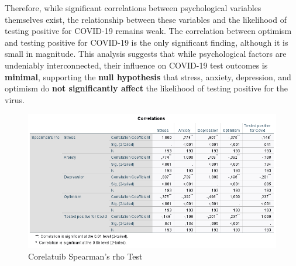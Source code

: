 \documentclass[a4paper]{article}
\begin{document}
\vspace{0.5em}\newline
Therefore, while significant correlations between psychological variables themselves exist, the relationship between these variables and the likelihood of testing positive for COVID-19 remains weak.
The correlation between optimism and testing positive for COVID-19 is the only significant finding, although it is small in magnitude.
\vspace{0.5em}\newline
This analysis suggests that while psychological factors are undeniably interconnected, their influence on COVID-19 test outcomes is \textbf{minimal}, supporting the \textbf{null hypothesis} that stress, anxiety,
depression, and optimism do \textbf{not significantly affect} the likelihood of testing positive for the virus.
\vspace{1.5em}


\begin{figure}[ht]
  \centering
  \caption{Corelatuib Spearman's rho Test}
  \label{fig:correlationsTest}
  \includegraphics[width=\textwidth]{img/correlations.png}  %
\end{figure}
\end{document}
